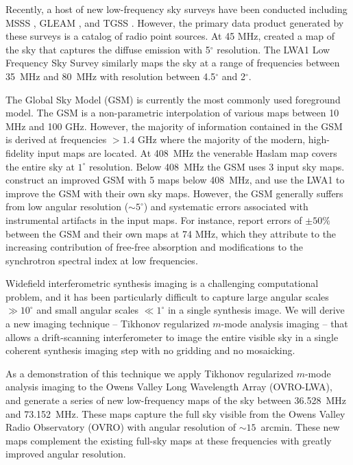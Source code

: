 \documentclass[twocolumn]{aastex61}
\begin{document}
Recently, a host of new low-frequency sky surveys have been conducted including MSSS
\citep{2015A&A...582A.123H}, GLEAM \citep{2015PASA...32...25W}, and TGSS
\citep{2017A&A...598A..78I}. However, the primary data product generated by these surveys is a
catalog of radio point sources. At 45 MHz, \citet{2011A&A...525A.138G} created a map of the sky that
captures the diffuse emission with 5$^\circ$ resolution.  The LWA1 Low Frequency Sky Survey
\citep{2017MNRAS.469.4537D} similarly maps the sky at a range of frequencies between 35~MHz and
80~MHz with resolution between 4.5$^\circ$ and 2$^\circ$.

The Global Sky Model (GSM) \citep{2008MNRAS.388..247D} is currently the most commonly used
foreground model. The GSM is a non-parametric interpolation of various maps between 10 MHz and 100
GHz. However, the majority of information contained in the GSM is derived at frequencies $>1.4$ GHz
where the majority of the modern, high-fidelity input maps are located. At 408~MHz the venerable
Haslam map \citep{1981A&A...100..209H, 1982A&AS...47....1H} covers the entire sky at $1^\circ$
resolution.  Below 408~MHz the GSM uses 3 input sky maps. \citet{2017MNRAS.464.3486Z} construct an
improved GSM with 5 maps below 408~MHz, and \citet{2017MNRAS.469.4537D} use the LWA1 to improve the
GSM with their own sky maps.  However, the GSM generally suffers from low angular resolution ($\sim
5^\circ$) and systematic errors associated with instrumental artifacts in the input maps.  For
instance, \citet{2017MNRAS.469.4537D} report errors of $\pm 50\%$ between the GSM and their own maps
at 74 MHz, which they attribute to the increasing contribution of free-free absorption and
modifications to the synchrotron spectral index at low frequencies.

Widefield interferometric synthesis imaging is a challenging computational problem, and it has been
particularly difficult to capture large angular scales $\gg 10^\circ$ and small angular scales $\ll
1^\circ$ in a single synthesis image. We will derive a new imaging technique -- Tikhonov regularized
$m$-mode analysis imaging -- that allows a drift-scanning interferometer to image the entire visible
sky in a single coherent synthesis imaging step with no gridding and no mosaicking.

As a demonstration of this technique we apply Tikhonov regularized $m$-mode analysis imaging to the
Owens Valley Long Wavelength Array (OVRO-LWA), and generate a series of new low-frequency maps of
the sky between 36.528~MHz and 73.152~MHz.  These maps capture the full sky visible from the Owens
Valley Radio Observatory (OVRO) with angular resolution of $\sim 15$~arcmin.  These new maps
complement the existing full-sky maps at these frequencies with greatly improved angular resolution.
\end{document}
